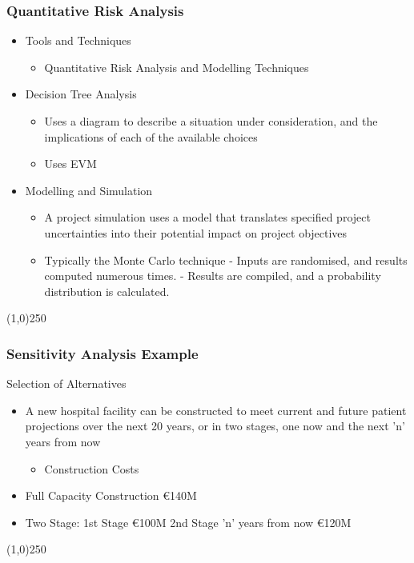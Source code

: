 \begin{frame}
\frametitle{Quantitative Risk Analysis}
\begin{itemize}
\item Tools and Techniques
\begin{itemize}
	\item Quantitative Risk Analysis and Modelling Techniques
\end{itemize}
\item Decision Tree Analysis
\begin{itemize}
	\item Uses a diagram to describe a situation under consideration, and the implications of each of the available choices
\item Uses EVM
\end{itemize}
\item Modelling and Simulation
\begin{itemize}
	\item A project simulation uses a model that translates specified project uncertainties into their potential impact on project objectives
\item Typically the Monte Carlo technique
- Inputs are randomised, and results computed numerous times.
- Results are compiled, and a probability distribution is calculated.
\end{itemize}
 
\end{itemize}
\end{frame}\begin{center}\line(1,0){250}\end{center}






\begin{frame}
\frametitle{Sensitivity Analysis Example}
Selection of Alternatives
\begin{itemize}
\item A new hospital facility can be constructed to meet current and future patient projections over the next 20 years, or in two stages, one now and the next 'n' years from now
\begin{itemize}
	\item Construction Costs
\end{itemize}
\item Full Capacity Construction	\euro140M
\item Two Stage: 1st Stage		\euro100M
			 2nd Stage 'n' years 
			 from now		\euro120M
\end{itemize}
\end{frame}\begin{center}\line(1,0){250}\end{center}



